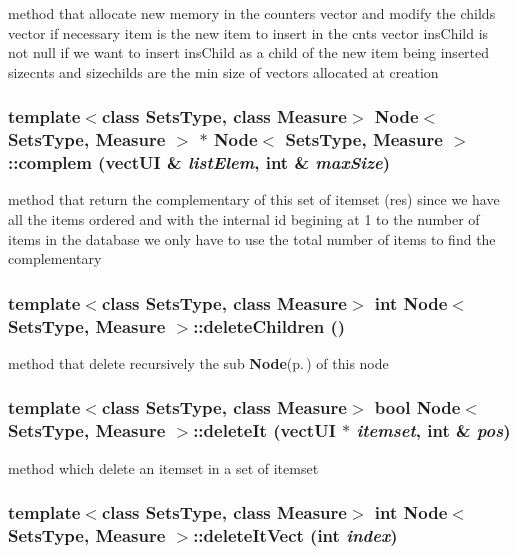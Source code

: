 method that allocate new memory in the counters vector and modify the childs vector if necessary item is the new item to insert in the cnts vector ins\-Child is not null if we want to insert ins\-Child as a child of the new item being inserted sizecnts and sizechilds are the min size of vectors allocated at creation 
\subsubsection{\setlength{\rightskip}{0pt plus 5cm}template$<$class Sets\-Type, class Measure$>$ {\bf Node}$<$ Sets\-Type, Measure $>$ $\ast$ {\bf Node}$<$ Sets\-Type, Measure $>$::complem (vect\-UI \& {\em list\-Elem}, int \& {\em max\-Size})}\label{class_node_a3be41dd7d34b71421bcce51edfd1516}


method that return the complementary of this set of itemset (res) since we have all the items ordered and with the internal id begining at 1 to the number of items in the database we only have to use the total number of items to find the complementary 
\subsubsection{\setlength{\rightskip}{0pt plus 5cm}template$<$class Sets\-Type, class Measure$>$ int {\bf Node}$<$ Sets\-Type, Measure $>$::delete\-Children ()}\label{class_node_51768328ab596c30ad943eb132b77d67}


method that delete recursively the sub {\bf Node}{\rm (p.\,\pageref{class_node})} of this node 
\subsubsection{\setlength{\rightskip}{0pt plus 5cm}template$<$class Sets\-Type, class Measure$>$ bool {\bf Node}$<$ Sets\-Type, Measure $>$::delete\-It (vect\-UI $\ast$ {\em itemset}, int \& {\em pos})}\label{class_node_98000cdef313e203299526f92d3215c9}


method which delete an itemset in a set of itemset 
\subsubsection{\setlength{\rightskip}{0pt plus 5cm}template$<$class Sets\-Type, class Measure$>$ int {\bf Node}$<$ Sets\-Type, Measure $>$::delete\-It\-Vect (int {\em index})}\label{class_node_8be4d0c5c3d8c8aa8e91c1f2aac0b119}


